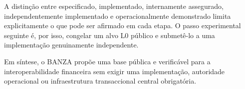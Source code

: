 \documentclass[journal abbreviation, manuscript]{copernicus}
\begin{document}
A distinção entre especificado, implementado, internamente assegurado, independentemente implementado e operacionalmente demonstrado limita explicitamente o que pode ser afirmado em cada etapa. O passo experimental seguinte é, por isso, congelar um alvo L0 público e submetê-lo a uma implementação genuinamente independente.

Em síntese, o BANZA propõe uma base pública e verificável para a interoperabilidade financeira sem exigir uma implementação, autoridade operacional ou infraestrutura transaccional central obrigatória.


\newpage
\section*{\refname}
\end{document}
